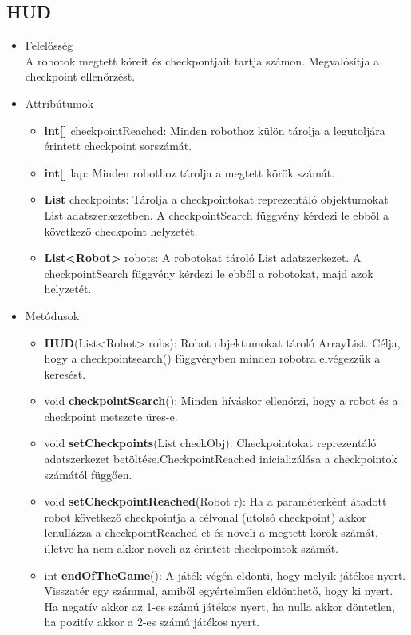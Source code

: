\subsection{HUD}
\begin{itemize}
\item Felelősség\\
A robotok megtett köreit és checkpontjait tartja számon. Megvalósítja a checkpoint ellenőrzést.
\item Attribútumok
	\begin{itemize}
		\item \textbf{int[]} checkpointReached: Minden robothoz külön tárolja a legutoljára érintett checkpoint sorszámát.
		\item \textbf{int[]} lap: Minden robothoz tárolja a megtett körök számát. 
		\item \textbf{List} checkpoints: Tárolja a checkpointokat reprezentáló objektumokat List adatszerkezetben. A checkpointSearch függvény kérdezi le ebből a következő checkpoint helyzetét. 
		\item \textbf{List<Robot>} robots: A robotokat tároló List adatszerkezet. A checkpointSearch függvény kérdezi le ebből a robotokat, majd azok helyzetét.
	\end{itemize}
\item Metódusok
	\begin{itemize}
		\item \textbf{HUD}(List<Robot> robs): Robot objektumokat tároló ArrayList. Célja, hogy a checkpointsearch() függvényben minden robotra elvégezzük a keresést.
		\item void \textbf{checkpointSearch}(): Minden híváskor ellenőrzi, hogy a robot és a checkpoint metszete üres-e. 
		\item void \textbf{setCheckpoints}(List checkObj): Checkpointokat reprezentáló adatszerkezet betöltése.CheckpointReached inicializálása a checkpointok számától függően.
		\item void \textbf{setCheckpointReached}(Robot r): Ha a paraméterként átadott robot következő checkpointja a célvonal (utolsó checkpoint) akkor lenullázza a checkpointReached-et és növeli a megtett körök számát, illetve ha nem akkor növeli az érintett checkpointok számát.
		\item int \textbf{endOfTheGame}(): A játék végén eldönti, hogy melyik játékos nyert. Visszatér egy számmal, amiből egyértelműen eldönthető, hogy ki nyert. Ha negatív akkor az 1-es számú játékos nyert, ha nulla akkor döntetlen, ha pozitív akkor a 2-es számú játékos nyert.
	\end{itemize}
\end{itemize}

